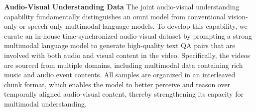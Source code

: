 \documentclass{article}
\begin{document}
\textbf{Audio-Visual Understanding Data} %
The joint audio-visual understanding capability fundamentally distinguishes an omni model from conventional vision-only or speech-only multimodal language models. To develop this capability, we curate an in-house time-synchronized audio-visual dataset by prompting a strong multimodal language model to generate high-quality text QA pairs that are involved with both audio and visual content in the video. 
Specifically, the videos are sourced from multiple domains, including multimodal data containing rich music and audio event contents.
All samples are organized in an interleaved chunk format, which enables the model to better perceive and reason over temporally aligned audio-visual content, thereby strengthening its capacity for multimodal understanding.


\end{document}
